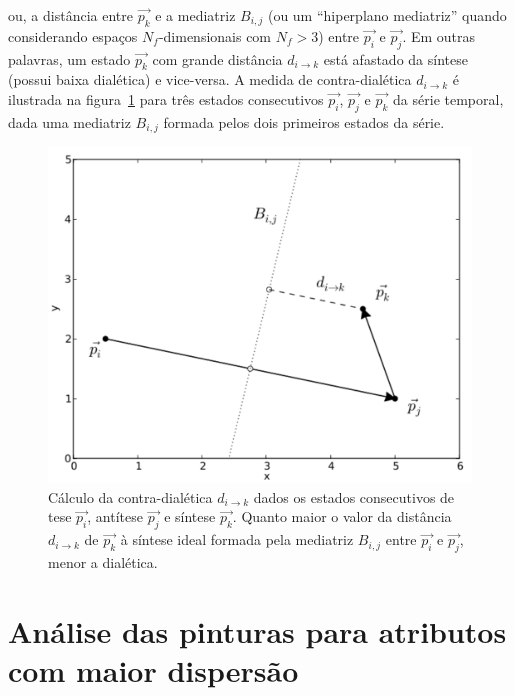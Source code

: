 \noindent ou, a distância entre $\vec{p_k}$ e a mediatriz $B_{i,j}$
(ou um ``hiperplano mediatriz'' quando considerando espaços
$N_f$-dimensionais com $N_f>3$) entre $\vec{p_i}$ e $\vec{p_j}$. Em
outras palavras, um estado $\vec{p_k}$ com grande distância $d_{i
  \rightarrow k}$ está afastado da síntese (possui baixa dialética) e
vice-versa. A medida de contra-dialética $d_{i \rightarrow k}$ é
ilustrada na figura~\ref{fig:desc_dialetica} para três estados
consecutivos $\vec{p_i}$, $\vec{p_j}$ e $\vec{p_k}$ da série temporal,
dada uma mediatriz $B_{i,j}$ formada pelos dois primeiros estados da
série.

\begin{figure}[ht!]
\begin{center}
      \caption{Cálculo da contra-dialética $d_{i \rightarrow k}$ dados os
        estados consecutivos de tese $\vec{p_i}$, antítese $\vec{p_j}$ e síntese
        $\vec{p_k}$. Quanto maior o valor da distância $d_{i \rightarrow k}$ de
        $\vec{p_k}$ à síntese ideal formada pela mediatriz $B_{i,j}$ entre
        $\vec{p_i}$ e $\vec{p_j}$, menor a dialética.  }
        \label{fig:desc_dialetica}
        \includegraphics[scale=.6]{figs/desc_dialetica2.pdf}
      \fonteminha
\end{center}
\end{figure}

\clearpage
\section{Análise das pinturas para atributos com maior dispersão}
\label{sec:pares}

